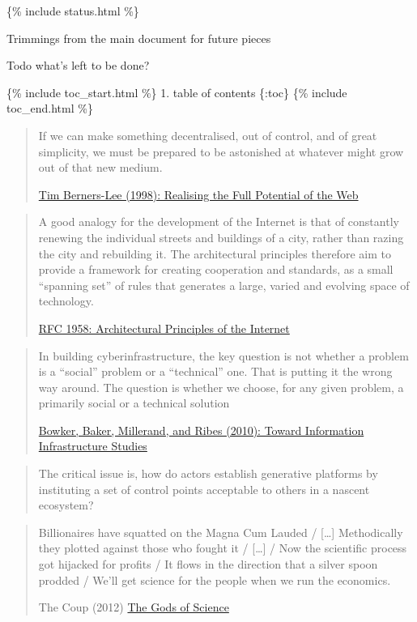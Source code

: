 \{\% include status.html \%\}

Trimmings {from the main document for future pieces}

Todo {what's left to be done?}

\{\% include toc\_start.html \%\} 1. table of contents \{:toc\} \{\%
include toc\_end.html \%\}

\begin{quote}
If we can make something decentralised, out of control, and of great
simplicity, we must be prepared to be astonished at whatever might grow
out of that new medium.

\href{https://www.w3.org/1998/02/Potential.html}{Tim Berners-Lee (1998):
Realising the Full Potential of the Web}
\end{quote}

\begin{quote}
A good analogy for the development of the Internet is that of constantly
renewing the individual streets and buildings of a city, rather than
razing the city and rebuilding it. The architectural principles
therefore aim to provide a framework for creating cooperation and
standards, as a small ``spanning set'' of rules that generates a large,
varied and evolving space of technology.

\href{https://datatracker.ietf.org/doc/html/rfc1958}{RFC 1958:
Architectural Principles of the Internet}
\end{quote}

\begin{quote}
In building cyberinfrastructure, the key question is not whether a
problem is a ``social'' problem or a ``technical'' one. That is putting
it the wrong way around. The question is whether we choose, for any
given problem, a primarily social or a technical solution

\href{https://doi.org/10.1007/978-1-4020-9789-8_5}{Bowker, Baker,
Millerand, and Ribes (2010): Toward Information Infrastructure Studies}
\citep{bowkerInformationInfrastructureStudies2010} 
\end{quote}

\begin{quote}
The critical issue is, how do actors establish generative platforms by
instituting a set of control points acceptable to others in a nascent
ecosystem? \citep{tilsonDigitalInfrastructuresMissing2010} 
\end{quote}

\begin{quote}
Billionaires have squatted on the Magna Cum Lauded / {[}\ldots{]}
Methodically they plotted against those who fought it / {[}\ldots{]} /
Now the scientific process got hijacked for profits / It flows in the
direction that a silver spoon prodded / We'll get science for the people
when we run the economics.

The Coup (2012) \href{https://youtu.be/lW59xoilGnw}{The Gods of Science}
\end{quote}

